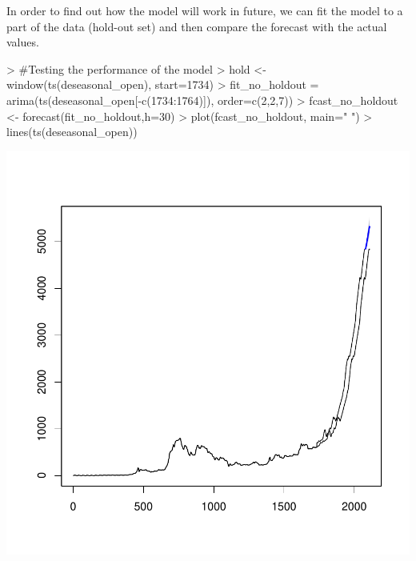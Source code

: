 \documentclass{article}
\begin{document}
In order to find out how the model will work in future, we can fit the model to a part of the data (hold-out set) and then compare the forecast with the actual values. 
\begin{Schunk}
\begin{Sinput}
> #Testing the performance of the model
> hold <- window(ts(deseasonal_open), start=1734)
> fit_no_holdout = arima(ts(deseasonal_open[-c(1734:1764)]), order=c(2,2,7))
> fcast_no_holdout <- forecast(fit_no_holdout,h=30)
> plot(fcast_no_holdout, main=" ")
> lines(ts(deseasonal_open))
\end{Sinput}
\end{Schunk}
\includegraphics{Report-021}
\end{document}
